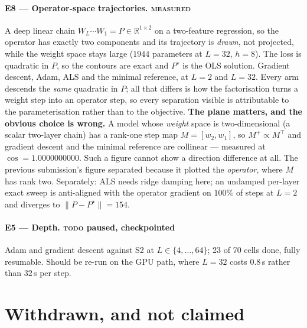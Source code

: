 \documentclass{article}
\newcommand{\RUN}{{\color{blue!70!black}\textsc{measured}}}
\newcommand{\TD}{{\color{orange!85!black}\textsc{todo}}}
\newcommand{\NOTE}[1]{{\color{gray}\small #1}}
\theoremstyle{plain}\newtheorem{theorem}{Theorem}\newtheorem{lemma}[theorem]{Lemma}
\theoremstyle{definition}\newtheorem{definition}[theorem]{Definition}
\newcommand{\R}{\mathbb{R}}\newcommand{\dW}{\Delta W}\newcommand{\Jop}{J}
\begin{document}
\paragraph{E8 --- Operator-space trajectories. \RUN{}}
A deep linear chain $W_L\cdots W_1=P\in\R^{1\times2}$ on a two-feature regression, so the operator
has exactly two components and its trajectory is \emph{drawn}, not projected, while the weight
space stays large ($1944$ parameters at $L{=}32$, $h{=}8$). The loss is quadratic in $P$, so the
contours are exact and $P^\star$ is the OLS solution. Gradient descent, Adam, ALS and the minimal
reference, at $L{=}2$ and $L{=}32$. Every arm descends the \emph{same} quadratic in $P$; all that
differs is how the factorisation turns a weight step into an operator step, so every separation
visible is attributable to the parameterisation rather than to the objective.
\NOTE{\textbf{The plane matters, and the obvious choice is wrong.} A model whose \emph{weight}
space is two-dimensional (a scalar two-layer chain) has a rank-one step map $M=[w_2,w_1]$, so
$M^{+}\propto M^\top$ and gradient descent and the minimal reference are collinear --- measured at
$\cos=1.0000000000$. Such a figure cannot show a direction difference at all. The previous
submission's figure separated because it plotted the \emph{operator}, where $M$ has rank two.
Separately: ALS needs ridge damping here; an undamped per-layer exact sweep is anti-aligned with
the operator gradient on $100\%$ of steps at $L{=}2$ and diverges to $\|P-P^\star\|=154$.}

\paragraph{E5 --- Depth. \TD{} paused, checkpointed}
Adam and gradient descent against S2 at $L\in\{4,\dots,64\}$; 23 of 70 cells done, fully
resumable. \NOTE{Should be re-run on the GPU path, where $L{=}32$ costs $0.8$\,s rather than
$32$\,s per step.}

\section{Withdrawn, and not claimed}\label{sec:withdrawn}
\end{document}
